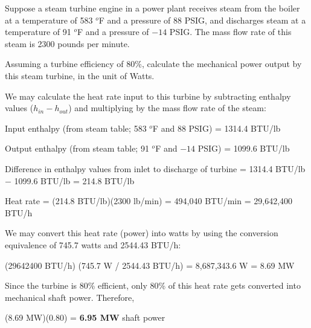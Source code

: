 

Suppose a steam turbine engine in a power plant receives steam from the boiler at a temperature of 583 $^{o}$F and a pressure of 88 PSIG, and discharges steam at a temperature of 91 $^{o}$F and a pressure of $-14$ PSIG.  The mass flow rate of this steam is 2300 pounds per minute. 

\vskip 10pt

Assuming a turbine efficiency of 80\%, calculate the mechanical power output by this steam turbine, in the unit of Watts.








We may calculate the heat rate input to this turbine by subtracting enthalpy values ($h_{in} - h_{out}$) and multiplying by the mass flow rate of the steam:

\vskip 10pt

Input enthalpy (from steam table; 583 $^{o}$F and 88 PSIG) = 1314.4 BTU/lb

\vskip 10pt

Output enthalpy (from steam table; 91 $^{o}$F and $-14$ PSIG) = 1099.6 BTU/lb

\vskip 10pt

Difference in enthalpy values from inlet to discharge of turbine = 1314.4 BTU/lb $-$ 1099.6 BTU/lb = 214.8 BTU/lb

\vskip 10pt

Heat rate = (214.8 BTU/lb)(2300 lb/min) = 494,040 BTU/min = 29,642,400 BTU/h
 
\vskip 10pt

We may convert this heat rate (power) into watts by using the conversion equivalence of 745.7 watts and 2544.43 BTU/h:

\vskip 10pt

(29642400 BTU/h) (745.7 W / 2544.43 BTU/h) = 8,687,343.6 W = 8.69 MW

\vskip 10pt

Since the turbine is 80\% efficient, only 80\% of this heat rate gets converted into mechanical shaft power.  Therefore,

\vskip 10pt

(8.69 MW)(0.80) = {\bf 6.95 MW} shaft power












